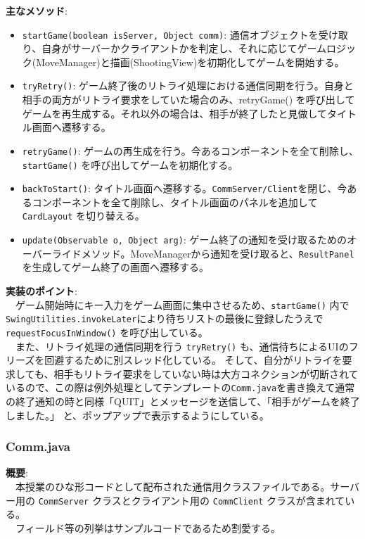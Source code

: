 \documentclass[11pt,a4j]{jarticle}
\begin{document}
\noindent\textbf{主なメソッド}:
\begin{itemize}
    \item \texttt{startGame(boolean isServer, Object comm)}: 通信オブジェクトを受け取り、自身がサーバーかクライアントかを判定し、それに応じてゲームロジック(MoveManager)と描画(ShootingView)を初期化してゲームを開始する。
    \item \texttt{tryRetry()}: ゲーム終了後のリトライ処理における通信同期を行う。自身と相手の両方がリトライ要求をしていた場合のみ、retryGame() を呼び出してゲームを再生成する。それ以外の場合は、相手が終了したと見做してタイトル画面へ遷移する。
    \item \texttt{retryGame()}: ゲームの再生成を行う。今あるコンポーネントを全て削除し、\texttt{startGame()} を呼び出してゲームを初期化する。
    \item \texttt{backToStart()}: タイトル画面へ遷移する。\texttt{CommServer/Client}を閉じ、今あるコンポーネントを全て削除し、タイトル画面のパネルを追加して \texttt{CardLayout} を切り替える。
    \item \texttt{update(Observable o, Object arg)}: ゲーム終了の通知を受け取るためのオーバーライドメソッド。MoveManagerから通知を受け取ると、\texttt{ResultPanel} を生成してゲーム終了の画面へ遷移する。
\end{itemize}

\noindent\textbf{実装のポイント}: \\
　ゲーム開始時にキー入力をゲーム画面に集中させるため、\texttt{startGame()} 内で\texttt{SwingUtilities.invokeLater}により待ちリストの最後に登録したうえで \texttt{requestFocusInWindow()} を呼び出している。\\
　また、リトライ処理の通信同期を行う \texttt{tryRetry()} も、通信待ちによるUIのフリーズを回避するために別スレッド化している。
そして、自分がリトライを要求しても、相手もリトライ要求をしていない時は大方コネクションが切断されているので、この際は例外処理としてテンプレートの\texttt{Comm.java}を書き換えて通常の終了通知の時と同様「QUIT」とメッセージを送信して、「相手がゲームを終了しました。」
と、ポップアップで表示するようにしている。


\subsubsection{Comm.java}

\noindent\textbf{概要}: \\
　本授業のひな形コードとして配布された通信用クラスファイルである。サーバー用の \texttt{CommServer} クラスとクライアント用の \texttt{CommClient} クラスが含まれている。\\
　フィールド等の列挙はサンプルコードであるため割愛する。
\end{document}
